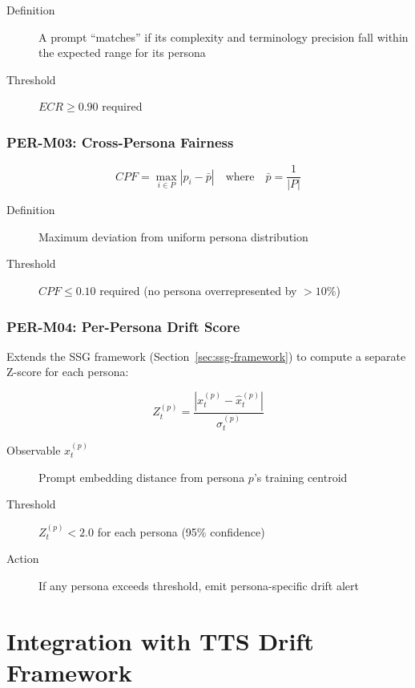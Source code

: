 \begin{description}
  \item[Definition] A prompt ``matches'' if its complexity and terminology precision
        fall within the expected range for its persona
  \item[Threshold] $ECR \geq 0.90$ required
\end{description}

\subsubsection{PER-M03: Cross-Persona Fairness}

\begin{equation}
\boxed{
CPF = \max_{i \in P} |p_i - \bar{p}|
\quad \text{where} \quad
\bar{p} = \frac{1}{|P|}
}
\end{equation}

\begin{description}
  \item[Definition] Maximum deviation from uniform persona distribution
  \item[Threshold] $CPF \leq 0.10$ required (no persona overrepresented by $>10\%$)
\end{description}

\subsubsection{PER-M04: Per-Persona Drift Score}

Extends the SSG framework (Section~\ref{sec:ssg-framework}) to compute a separate
Z-score for each persona:

\begin{equation}
\boxed{
Z_t^{(p)} = \frac{|x_t^{(p)} - \hat{x}_t^{(p)}|}{\sigma_t^{(p)}}
}
\end{equation}

\begin{description}
  \item[Observable $x_t^{(p)}$] Prompt embedding distance from persona $p$'s training centroid
  \item[Threshold] $Z_t^{(p)} < 2.0$ for each persona (95\% confidence)
  \item[Action] If any persona exceeds threshold, emit persona-specific drift alert
\end{description}

\section{Integration with TTS Drift Framework}
\label{sec:tts-integration}

